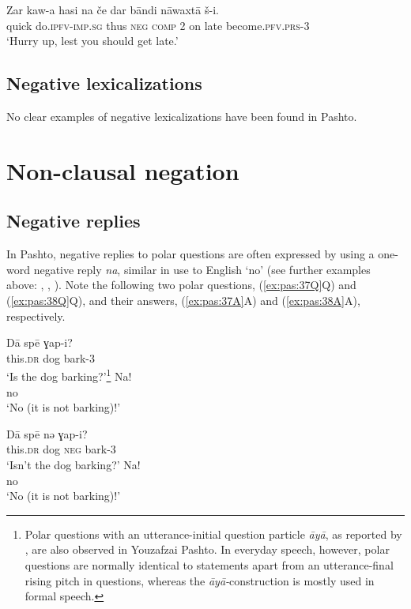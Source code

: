 \documentclass[output=paper,colorlinks,citecolor=brown]{langscibook}
\begin{document}
\ea\label{ex:pas:36} 
    \gll  Zar kaw-a hasi na če dar b\={a}ndi n\={a}waxt\={a}  š-i.\\ 
          quick do.\textsc{ipfv{}-imp.sg} thus \textsc{neg} \textsc{comp} \textsc{2} on late become.\textsc{pfv.prs{}-3} \\
    \glt ‘Hurry up, lest you should get late.’
\z 
 
\subsection{Negative lexicalizations}\label{sec:pas:2.5}

No clear examples of negative lexicalizations have been found in Pashto. 

\section{Non-clausal negation}\label{sec:pas:3}
\subsection{Negative replies}\label{sec:pas:3.1}

In Pashto, negative replies to polar questions are often expressed by using a one-word negative reply \textit{na}, similar in use to English ‘no’ (see further examples above: , , ). Note the following two polar questions, (\ref{ex:pas:37Q}Q) and (\ref{ex:pas:38Q}Q), and their answers, (\ref{ex:pas:37A}A) and (\ref{ex:pas:38A}A), respectively.

\ea\label{ex:key:37}
    \begin{xlist}
    \label{ex:pas:37Q}
        \gll  D\={a}  sp\={e}  ɣap{}-i?\\ 
              this.\textsc{dr} dog bark{}-3\\ 
        \glt  ‘Is the dog barking?’\footnote{Polar questions with an utterance-initial question particle \textit{āyā}, as reported by \citet[417]{BrugmanDavid2014}, are also observed in Youzafzai Pashto. In everyday speech, however, polar questions are normally identical to statements apart from an utterance-final rising pitch in questions, whereas the \textit{āyā{}-}construction is mostly used in formal speech.} 
    \label{ex:pas:37A}
        \gll  Na!\\ 
                no\\
        \glt ‘No (it is not barking)!’
    \end{xlist}
\z
\ea\label{ex:key:38}
    \begin{xlist}
    \label{ex:pas:38Q}
        \gll  D\={a}  sp\={e}  nə ɣap{}-i?\\ 
              this.\textsc{dr} dog \textsc{neg} bark-3\\ 
        \glt ‘Isn’t the dog barking?’
    \label{ex:pas:38A}
        \gll  Na!\\ 
            no\\
        \glt ‘No (it is not barking)!’
    \end{xlist}
\z
\end{document}
